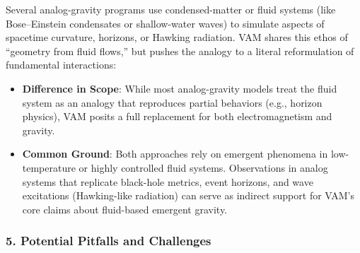 \documentclass[aps,preprint,superscriptaddress]{revtex4-2}
\begin{document}
    Several analog-gravity programs use condensed-matter or fluid systems (like Bose–Einstein condensates or shallow-water waves) to simulate aspects of spacetime curvature, horizons, or Hawking radiation. VAM shares this ethos of “geometry from fluid flows,” but pushes the analogy to a literal reformulation of fundamental interactions:

    \begin{itemize}
        \item \textbf{Difference in Scope}: While most analog-gravity models treat the fluid system as an analogy that reproduces partial behaviors (e.g., horizon physics), VAM posits a full replacement for both electromagnetism and gravity.
        \item \textbf{Common Ground}: Both approaches rely on emergent phenomena in low-temperature or highly controlled fluid systems. Observations in analog systems that replicate black-hole metrics, event horizons, and wave excitations (Hawking-like radiation) can serve as indirect support for VAM’s core claims about fluid-based emergent gravity.
    \end{itemize}

    \subsubsection*{5. Potential Pitfalls and Challenges}
\end{document}
